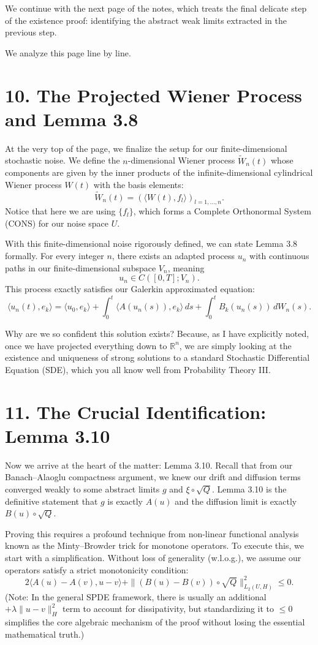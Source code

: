 \documentclass[11pt]{article}
\theoremstyle{definition}
\theoremstyle{remark}
\begin{document}
We continue with the next page of the notes, which treats the final delicate step of the existence proof: identifying the abstract weak limits extracted in the previous step.

We analyze this page line by line.

\section*{10. The Projected Wiener Process and Lemma 3.8}
At the very top of the page, we finalize the setup for our finite-dimensional stochastic noise. We define the $n$-dimensional Wiener process $\tilde W_n(t)$ whose components are given by the inner products of the infinite-dimensional cylindrical Wiener process $W(t)$ with the basis elements:
\[
  \tilde W_n(t) = (\langle W(t), f_l \rangle)_{l=1,\dots,n}.
\]
Notice that here we are using $\{f_l\}$, which forms a Complete Orthonormal System (CONS) for our noise space $U$.

With this finite-dimensional noise rigorously defined, we can state Lemma 3.8 formally. For every integer $n$, there exists an adapted process $u_n$ with continuous paths in our finite-dimensional subspace $V_n$, meaning
\[
  u_n \in C([0,T];V_n).
\]
This process exactly satisfies our Galerkin approximated equation:
\[
  \langle u_n(t), e_k \rangle = \langle u_0, e_k \rangle + \int_0^t \langle A(u_n(s)), e_k \rangle\,ds + \int_0^t B_k(u_n(s))\,dW_n(s).
\]

Why are we so confident this solution exists? Because, as I have explicitly noted, once we have projected everything down to $\mathbb{R}^n$, we are simply looking at the existence and uniqueness of strong solutions to a standard Stochastic Differential Equation (SDE), which you all know well from Probability Theory III.

\section*{11. The Crucial Identification: Lemma 3.10}
Now we arrive at the heart of the matter: Lemma 3.10. Recall that from our Banach--Alaoglu compactness argument, we knew our drift and diffusion terms converged weakly to some abstract limits $g$ and $\xi \circ \sqrt{Q}$. Lemma 3.10 is the definitive statement that $g$ is exactly $A(u)$ and the diffusion limit is exactly $B(u)\circ \sqrt{Q}$.

Proving this requires a profound technique from non-linear functional analysis known as the Minty--Browder trick for monotone operators. To execute this, we start with a simplification. Without loss of generality (w.l.o.g.), we assume our operators satisfy a strict monotonicity condition:
\[
  2\langle A(u)-A(v), u-v \rangle + \|(B(u)-B(v))\circ \sqrt{Q}\|_{L_2(U,H)}^2 \le 0.
\]
(Note: In the general SPDE framework, there is usually an additional $+\lambda\|u-v\|_H^2$ term to account for dissipativity, but standardizing it to $\le 0$ simplifies the core algebraic mechanism of the proof without losing the essential mathematical truth.)
\end{document}
